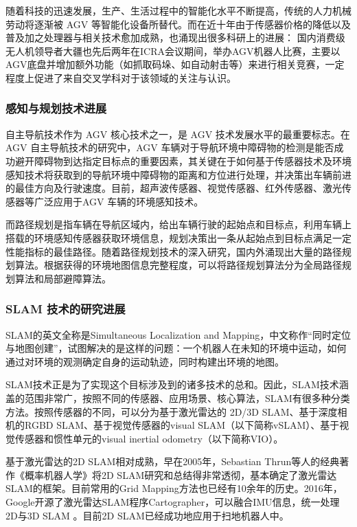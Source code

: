 随着科技的迅速发展，生产、生活过程中的智能化水平不断提高，传统的人力机械劳动将逐渐被 AGV 等智能化设备所替代。而在近十年由于传感器价格的降低以及普及加之处理器与相关技术愈加成熟，也涌现出很多科研上的进展：
国内消费级无人机领导者大疆也先后两年在ICRA会议期间，举办AGV机器人比赛，主要以AGV底盘并增加额外功能（如抓取码垛、如自动射击等）来进行相关竞赛，一定程度上促进了来自交叉学科对于该领域的关注与认识。


\subsubsection{感知与规划技术进展}

自主导航技术作为 AGV 核心技术之一，是 AGV 技术发展水平的最重要标志。在AGV 自主导航技术的研究中，AGV 车辆对于导航环境中障碍物的检测是能否成功避开障碍物到达指定目标点的重要因素，其关键在于如何基于传感器技术及环境感知技术将获取到的导航环境中障碍物的距离和方位进行处理，并决策出车辆前进的最佳方向及行驶速度。目前，超声波传感器、视觉传感器、红外传感器、激光传感器等广泛应用于AGV 车辆的环境感知技术。

而路径规划是指车辆在导航区域内，给出车辆行驶的起始点和目标点，利用车辆上搭载的环境感知传感器获取环境信息，规划决策出一条从起始点到目标点满足一定性能指标的最佳路径。随着路径规划技术的深入研究，国内外涌现出大量的路径规划算法。根据获得的环境地图信息完整程度，可以将路径规划算法分为全局路径规划算法和局部避障算法。 

\subsubsection{SLAM 技术的研究进展}

SLAM的英文全称是Simultaneous Localization and Mapping，中文称作“同时定位与地图创建”，试图解决的是这样的问题：一个机器人在未知的环境中运动，如何通过对环境的观测确定自身的运动轨迹，同时构建出环境的地图。

SLAM技术正是为了实现这个目标涉及到的诸多技术的总和。因此，SLAM技术涵盖的范围非常广，按照不同的传感器、应用场景、核心算法，SLAM有很多种分类方法。按照传感器的不同，可以分为基于激光雷达的 2D/3D SLAM、基于深度相机的RGBD SLAM、基于视觉传感器的visual SLAM（以下简称vSLAM）、基于视觉传感器和惯性单元的visual inertial odometry（以下简称VIO）。

基于激光雷达的2D SLAM相对成熟，早在2005年，Sebastian Thrun等人的经典著作《概率机器人学》将2D SLAM研究和总结得非常透彻，基本确定了激光雷达SLAM的框架。目前常用的Grid Mapping方法也已经有10余年的历史。2016年，Google开源了激光雷达SLAM程序Cartographer，可以融合IMU信息，统一处理2D与3D SLAM 。目前2D SLAM已经成功地应用于扫地机器人中。

